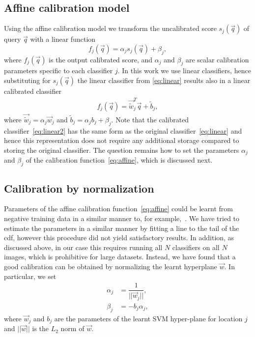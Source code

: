   \subsection{Affine calibration model}
    Using the affine calibration model we transform the uncalibrated score $s_j(\vec{q})$ of query $\vec{q}$ with a linear function 
      \begin{equation}
       f_j(\vec{q}) = \alpha_j s_j(\vec{q}) + \beta_j,
       \label{eq:affine}
      \end{equation}
    where 
    $ f_j(\vec{q})$ is the output calibrated score, and
    $\alpha_j$ and $\beta_j$ are scalar calibration parameters specific to each classifier $j$.
    In this work we use linear classifiers, hence substituting for $s_j(\vec{q})$ %
    the linear classifier from \eqref{eq:linear} results also in a linear calibrated classifier
      \begin{align}
      \label{eq:linear2}
          f_j(\vec{q}) = \vec{\widetilde{w}}_j^T \vec{q} + \widetilde{b}_j,
       \end{align}
  where $\vec{\widetilde{w}}_j = \alpha_j\vec{w}_j$ and $\widetilde{b}_j=\alpha_j b_j+\beta_j$. 
  Note that the calibrated classifier~\eqref{eq:linear2} has the same form as the original classifier~\eqref{eq:linear} and hence this representation does not require any additional storage compared to storing the original classifier. The question remains how to set the parameters $\alpha_j$ and $\beta_j$ of the calibration function~\eqref{eq:affine}, which is discussed next.


  \subsection{Calibration by normalization}
  \label{sec:calibration_by_renormalization}
    Parameters of the affine calibration function~\eqref{eq:affine} could be learnt from negative training data in a similar manner to, for example,~\cite{Aubry14}. 
    We have tried to estimate the parameters in a similar manner by fitting a line to the tail of the cdf, however this procedure did not yield satisfactory results.
    In addition, as discussed above, in our case this requires running all $N$ classifiers on all $N$ images, which is prohibitive for large datasets.
    Instead, we have found that a good calibration can be obtained by normalizing the learnt hyperplane $\vec{w}$. In particular, we set 
      \begin{align}
        \label{eq:rescale1}
        \alpha_j &= \dfrac{1}{||\vec{w}_j||},\\ 
        \label{eq:rescale2}
        \beta_j &=  -b_j \alpha_j, 
      \end{align}
    where $\vec{w}_j$ and $b_j$ are the parameters of the learnt SVM hyper-plane for location $j$ and $||\vec{w}||$ is the $L_2$ norm of $\vec{w}$. 

